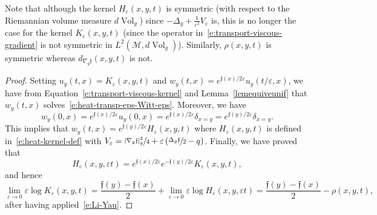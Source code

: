 \documentclass[11pt]{article}
\numberwithin{equation}{section}
\theoremstyle{definition}
\newcommand{\M}{\ensuremath{\mathcal M}}
\newcommand{\f}{\ensuremath{\mathfrak{f}}}
\DeclareMathOperator{\Vol}{Vol}
\newcommand\bnp{\begin{proof}}
\newcommand\enp{\end{proof}}
\newcommand\Lap{\Delta_{g}}
\newcommand\nablag{\nabla_{g}}
\let\e\varepsilon
\let\eps\varepsilon
\let\q q
\begin{document}
Note that although the kernel $H_\e(x,y,t)$ is symmetric (with respect to the Riemannian volume measure $d\Vol_g$) since $-\Delta_g+\frac{1}{\e^2} V_\eps$ is, this is no longer the case for the kernel $K_\e(x,y,t)$ (since the operator in~\eqref{e:transport-viscous-gradient} is not symmetric in $L^2(\M,d\Vol_g)$). Similarly, $\rho(x,y,t)$ is symmetric whereas $d_{\nablag \f}(x,y,t)$ is not.

\bnp
Setting $u_y(t,x) = K_{\e}(x,y, t)$ and $w_y(t,x) = e^{\f(x)/2\eps} u_y(t/\eps,x)$, we have from Equation~\eqref{e:transport-viscous-kernel} and Lemma~\ref{lemequiveunif} that $w_y(t,x)$ solves~\eqref{e:heat-transp-eps-Witt-eps}. Moreover, we have
\[
w_y(0,x)= e^{\f(x)/2\eps} u_y(0,x)= e^{\f(x)/2\eps} \delta_{x=y} = e^{\f(y)/2\eps}\delta_{x=y}.
\]
This implies that $w_y (t,x) = e^{\f(y)/2\eps} H_\eps (x,y,t)$ where $H_\eps (x,y,t)$ is defined in~\eqref{e:heat-kernel-def} with $V_\eps = \sfrac{|\nablag \f|_g^2}{4} + \eps \left( \sfrac{\Lap \f}{2}- \q \right)$.
Finally, we have proved that
\[
H_\eps (x,y,\eps t) =e^{\f(x)/2\eps} e^{-\f(y)/2\eps} K_\eps (x,y,t),
\]
and hence
\[
\underset{\e\to 0}{\lim}\e \log K_{\e}(x,y, t)= \frac{\f(y)-\f(x)}{2} +\underset{\e\to 0}{\lim}\e \log H_{\e}(x,y,\eps t)
= \frac{\f(y)-\f(x)}{2} -\rho(x,y,t),
\]
after having applied~\eqref{e:Li-Yau}.
\enp
\end{document}
